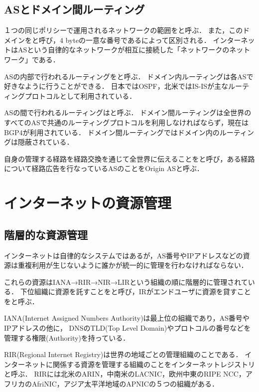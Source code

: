 \subsection{ASとドメイン間ルーティング}

１つの同じポリシーで運用されるネットワークの範囲をと呼ぶ．
また，このドメインをと呼び，4 byteの一意な番号であるによって区別される．
インターネットはASという自律的なネットワークが相互に接続した「ネットワークのネットワーク」である．

ASの内部で行われるルーティングをと呼ぶ．
ドメイン内ルーティングは各ASで好きなように行うことができる．
日本ではOSPF，北米ではIS-ISが主なルーティングプロトコルとして利用されている．

ASの間で行われるルーティングはと呼ぶ．
ドメイン間ルーティングは全世界のすべてのASで共通のルーティングプロトコルを利用しなければならず，現在はBGP4が利用されている．
ドメイン間ルーティングではドメイン内のルーティングは隠蔽されている．

自身の管理する経路を経路交換を通じて全世界に伝えることをと呼び，ある経路について経路広告を行なっているASのことをOrigin ASと呼ぶ．

\section{インターネットの資源管理}

\subsection{階層的な資源管理}

インターネットは自律的なシステムではあるが，AS番号やIPアドレスなどの資源は重複利用が生じないように誰かが統一的に管理を行わなければならない．

これらの資源はIANA→RIR→NIR→LIRという組織の順に階層的に管理されている．
下位組織に資源を託すことをと呼び，IRがエンドユーザに資源を貸すことをと呼ぶ．

IANA(Internet Assigned Numbers Authority)は最上位の組織であり，AS番号やIPアドレスの他に，
DNSのTLD(Top Level Domain)やプロトコルの番号などを管理する権限(Authority)を持っている．

RIR(Regional Internet Registry)は世界の地域ごとの管理組織のことである．
インターネットに関係する資源を管理する組織のことをインターネットレジストリと呼ぶ．
RIRには北米のARIN，中南米のLACNIC，欧州中東のRIPE NCC，アフリカのAfriNIC，アジア太平洋地域のAPNICの５つの組織がある．

